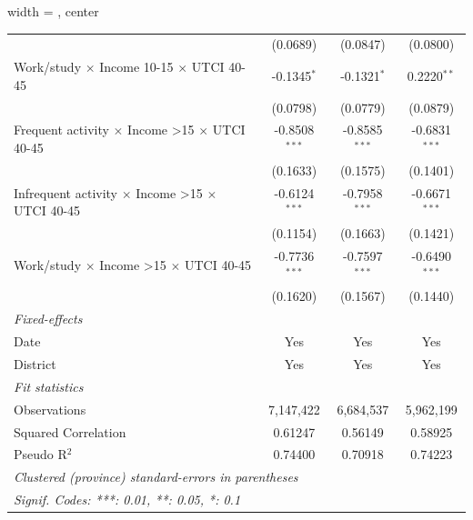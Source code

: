 \begin{table}[htbp]
\begin{adjustbox}{width = \textwidth, center}
\begin{tabular}{lccc}
                                                                         & (0.0689)                  & (0.0847)                & (0.0800)\\   
         Work/study $\times$ Income 10-15 $\times$ UTCI 40-45            & -0.1345$^{*}$             & -0.1321$^{*}$           & 0.2220$^{**}$\\   
                                                                         & (0.0798)                  & (0.0779)                & (0.0879)\\   
         Frequent activity $\times$ Income >15 $\times$ UTCI 40-45       & -0.8508$^{***}$           & -0.8585$^{***}$         & -0.6831$^{***}$\\   
                                                                         & (0.1633)                  & (0.1575)                & (0.1401)\\   
         Infrequent activity $\times$ Income >15 $\times$ UTCI 40-45     & -0.6124$^{***}$           & -0.7958$^{***}$         & -0.6671$^{***}$\\   
                                                                         & (0.1154)                  & (0.1663)                & (0.1421)\\   
         Work/study $\times$ Income >15 $\times$ UTCI 40-45              & -0.7736$^{***}$           & -0.7597$^{***}$         & -0.6490$^{***}$\\   
                                                                         & (0.1620)                  & (0.1567)                & (0.1440)\\   
         \midrule
         \emph{Fixed-effects}\\
         Date                                                            & Yes                       & Yes                     & Yes\\  
         District                                                        & Yes                       & Yes                     & Yes\\  
         \midrule
         \emph{Fit statistics}\\
         Observations                                                    & 7,147,422                 & 6,684,537               & 5,962,199\\  
         Squared Correlation                                             & 0.61247                   & 0.56149                 & 0.58925\\  
         Pseudo R$^2$                                                    & 0.74400                   & 0.70918                 & 0.74223\\  
         \midrule \midrule
         \multicolumn{4}{l}{\emph{Clustered (province) standard-errors in parentheses}}\\
         \multicolumn{4}{l}{\emph{Signif. Codes: ***: 0.01, **: 0.05, *: 0.1}}\\
      \end{tabular}
   \end{adjustbox}
\end{table}


